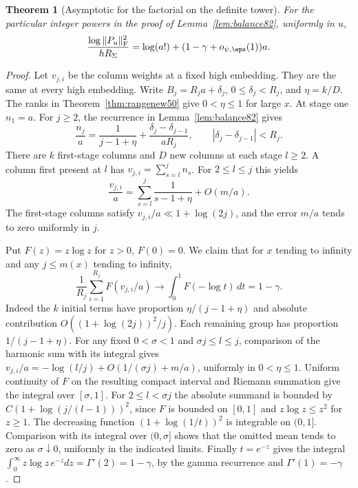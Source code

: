 \documentclass[a4paper,11pt]{article}
\newtheorem{theorem}[proposition]{Theorem}
\theoremstyle{definition}
\theoremstyle{remark}
\numberwithin{equation}{section}
\begin{document}
\begin{theorem}[Asymptotic for the factorial on the definite tower]
\label{thm:asym84}
For the particular integer powers in the proof of
Lemma~\ref{lem:balance82}, uniformly in \(u\),
\begin{equation}
 \frac{\log\|P_u\|_{\rm F}^2}{hR_\Sigma}
     =\log(a!)+(1-\gamma+o_{\psi,\eps}(1))a.             \label{eq:asym84}
\end{equation}
\end{theorem}
\begin{proof}
Let \(v_{j,i}\) be the column weights at a fixed high embedding.
They are the same at every high embedding. Write
\(B_j=R_ja+\delta_j\), \(0\le\delta_j<R_j\), and \(\eta=k/D\).
The ranks in Theorem~\ref{thm:rangenew50} give \(0<\eta\le1\)
for large \(x\). At stage one \(n_1=a\). For \(j\ge2\),
the recurrence in Lemma~\ref{lem:balance82} gives
\[
 \frac{n_j}{a}=\frac1{j-1+\eta}
                  +\frac{\delta_j-\delta_{j-1}}{aR_j},
 \qquad |\delta_j-\delta_{j-1}|<R_j .
\]
There are \(k\) first-stage columns and \(D\) new columns at
each stage \(l\ge2\). A column first present at \(l\) has
\(v_{j,i}=\sum_{s=l}^j n_s\). For \(2\le l\le j\) this yields
\[
 \frac{v_{j,i}}a=\sum_{s=l}^j\frac1{s-1+\eta}+O(m/a).
\]
The first-stage columns satisfy \(v_{j,i}/a\ll 1+\log(2j)\),
and the error \(m/a\) tends to zero uniformly in \(j\).

Put \(F(z)=z\log z\) for \(z>0\), \(F(0)=0\). We claim
that for \(x\) tending to infinity and any \(j\le m(x)\)
tending to infinity,
\begin{equation}
  \frac1{R_j}\sum_{i=1}^{R_j} F(v_{j,i}/a)
    \longrightarrow \int_0^1 F(-\log t)\,dt=1-\gamma.    \label{eq:dist84}
\end{equation}
Indeed the \(k\) initial terms have proportion
\(\eta/(j-1+\eta)\) and absolute contribution
\(O((1+\log(2j))^2/j)\). Each remaining group has proportion
\(1/(j-1+\eta)\). For any fixed \(0<\sigma<1\) and
\(\sigma j\le l\le j\), comparison of the harmonic sum with
its integral gives
\(v_{j,i}/a=-\log(l/j)+O(1/(\sigma j)+m/a)\), uniformly in
\(0<\eta\le1\). Uniform continuity of \(F\) on the resulting
compact interval and Riemann summation give the integral over
\([\sigma,1]\). For \(2\le l<\sigma j\) the absolute summand is
bounded by \(C(1+\log(j/(l-1)))^2\), since \(F\) is bounded
on \([0,1]\) and \(z\log z\le z^2\) for \(z\ge1\). The decreasing
function \((1+\log(1/t))^2\) is integrable on \((0,1]\).
Comparison with its integral over \((0,\sigma]\) shows that the
omitted mean tends to zero as \(\sigma\downarrow0\), uniformly
in the indicated limits. Finally \(t=e^{-z}\) gives the
integral \(\int_0^\infty z\log z\,e^{-z}dz=\Gamma'(2)=1-\gamma\),
by the gamma recurrence and \(\Gamma'(1)=-\gamma\).


\end{proof}
\end{document}
